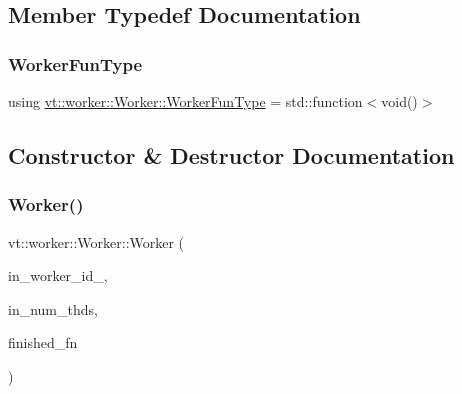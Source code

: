 \subsection{Member Typedef Documentation}
\mbox{\label{structvt_1_1worker_1_1_worker_a644fce67088c46d1e9e3d1e214d2e632}} 
\subsubsection{\texorpdfstring{Worker\+Fun\+Type}{WorkerFunType}}
{\footnotesize\ttfamily using \hyperlink{structvt_1_1worker_1_1_worker_a644fce67088c46d1e9e3d1e214d2e632}{vt\+::worker\+::\+Worker\+::\+Worker\+Fun\+Type} =  std\+::function$<$void()$>$}



\subsection{Constructor \& Destructor Documentation}
\mbox{\label{structvt_1_1worker_1_1_worker_abcf7d80b7c04de054f178a48b9e8f290}} 
\subsubsection{\texorpdfstring{Worker()}{Worker()}\hspace{0.1cm}{\footnotesize\ttfamily [1/2]}}
{\footnotesize\ttfamily vt\+::worker\+::\+Worker\+::\+Worker (\begin{DoxyParamCaption}\item[{\hyperlink{namespacevt_a656e362091da17b9b93d0655b36e3392}{Worker\+I\+D\+Type} const \&}]{in\+\_\+worker\+\_\+id\+\_\+,  }\item[{\hyperlink{namespacevt_aa93398ea48f2cb6c188512250f7cc248}{Worker\+Count\+Type} const \&}]{in\+\_\+num\+\_\+thds,  }\item[{\hyperlink{namespacevt_1_1worker_ae32a174a5348d27aafe73c2debea1a94}{Worker\+Finished\+Fn\+Type}}]{finished\+\_\+fn }\end{DoxyParamCaption})}

\mbox{\label{structvt_1_1worker_1_1_worker_a3c1945e6d1776c6ba065a4dc466904f7}} 
